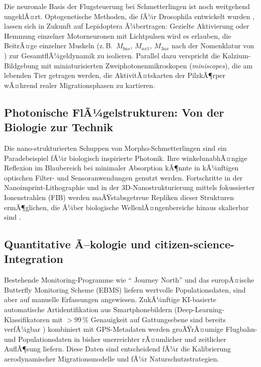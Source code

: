 ﻿\documentclass[a4paper,12pt]{article}
\theoremstyle{definition}
\begin{document}
	Die neuronale Basis der Flugsteuerung bei Schmetterlingen ist noch weitgehend
	ungeklÃ¤rt.
	Optogenetische Methoden, die fÃ¼r Drosophila entwickelt wurden \cite{lima2005remote},
	lassen sich in Zukunft auf Lepidoptera Ã¼bertragen:
	Gezielte Aktivierung oder Hemmung einzelner Motorneuronen mit Lichtpulsen
	wird es erlauben, die BeitrÃ¤ge einzelner Muskeln (z.\,B.\ $M_{bas}$,
	$M_{ax1}$, $M_{3ax}$ nach der Nomenklatur von \cite{wootton1981support})
	zur GesamtflÃ¼geldynamik zu isolieren.
	Parallel dazu verspricht die Kalzium-Bildgebung mit miniaturisierten
	Zweiphotonenmikroskopen (\textit{miniscopes}), die am lebenden Tier getragen
	werden, die AktivitÃ¤tskarten der PilzkÃ¶rper wÃ¤hrend realer Migrationsphasen
	zu kartieren.
	
	\subsection{Photonische FlÃ¼gelstrukturen: Von der Biologie zur Technik}
	
	Die nano-strukturierten Schuppen von Morpho-Schmetterlingen sind ein
	Paradebeispiel fÃ¼r biologisch inspirierte Photonik.
	Ihre winkelunabhÃ¤ngige Reflexion im Blaubereich bei minimaler Absorption
	kÃ¶nnte in kÃ¼nftigen optischen Filter- und Sensoranwendungen genutzt werden.
	Fortschritte in der Nanoimprint-Lithographie und in der 3D-Nanostrukturierung
	mittels fokussierter Ionenstrahlen (FIB) werden maÃŸstabsgetreue Repliken
	dieser Strukturen ermÃ¶glichen, die Ã¼ber biologische WellenlÃ¤ngenbereiche
	hinaus skalierbar sind \cite{vigneron2010morpho}.
	
	\subsection{Quantitative Ã–kologie und citizen-science-Integration}
	
	Bestehende Monitoring-Programme wie `` Journey North'' und das europÃ¤ische
	Butterfly Monitoring Scheme (EBMS) liefern wertvolle Populationsdaten,
	sind aber auf manuelle Erfassungen angewiesen.
	ZukÃ¼nftige KI-basierte automatische Artidentifikation aus Smartphonebildern
	(Deep-Learning-Klassifikatoren mit $> 99$\,\% Genauigkeit auf Gattungsebene
	sind bereits verfÃ¼gbar \cite{tabak2019machine}) kombiniert mit GPS-Metadaten
	werden groÃŸrÃ¤umige Flugbahn- und Populationsdaten in bisher unerreichter
	rÃ¤umlicher und zeitlicher AuflÃ¶sung liefern.
	Diese Daten sind entscheidend fÃ¼r die Kalibrierung aerodynamischer
	Migrationsmodelle und fÃ¼r Naturschutzstrategien.
	
\end{document}
